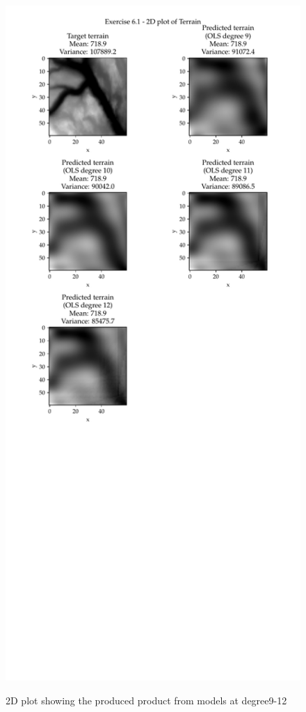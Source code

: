 \documentclass[11pt, a4paper]{article}
\begin{document}
\begin{figure}
  \centering
  \caption{2D plot showing the produced product from models at degree9-12}
  \hspace*{-1.2cm}  
  \includegraphics[scale=0.95]{figures/EX6_EX1_target_terrain_and_OLS_prediction_2D.pdf}
  \label{fig:EX6_1_OLS_2D}
\end{figure}
\end{document}
